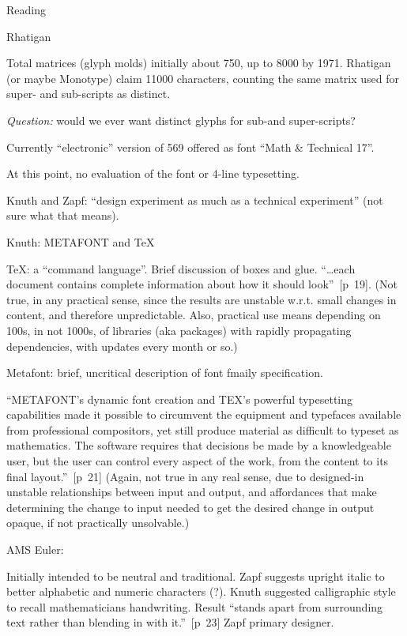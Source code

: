 \documentclass[11pt]{PalisadesLakesBook}
\begin{document}
\begin{plSection}{Reading}
\begin{plSection}{Rhatigan}
\begin{plSection}{}
\begin{plSection}{}
Total matrices (glyph molds) initially about 750, 
up to 8000 by 1971. 
Rhatigan (or maybe Monotype) claim 11000 characters,
counting the same matrix used for super- and sub-scripts
as distinct.

\emph{Question:} would we ever want distinct glyphs 
for sub-and super-scripts?

Currently ``electronic'' version of 569 offered as font
``Math \& Technical 17''.

At this point, no evaluation of the font or 4-line typesetting.

\end{plSection}%
\begin{plSection}{}

Knuth and Zapf: 
``design experiment as much as a technical experiment''
(not sure what that means).

Knuth: METAFONT and {\TeX}

TeX: a ``command language''. Brief discussion of boxes and glue.
``{\ldots}each document contains complete information 
about how it should look''~[p~19]. 
(Not true, in any practical sense,
since the results are unstable w.r.t. small changes in content,
and therefore unpredictable. Also, practical use means depending
on 100s, in not 1000s, of libraries (aka packages) 
with rapidly propagating dependencies, 
with updates every month or so.)

Metafont: brief, uncritical description of font fmaily specification.

``METAFONT's dynamic font creation and 
TEX's powerful typesetting capabilities 
made it possible to circumvent the equipment and typefaces 
available from professional compositors,
yet still produce material as difficult to typeset as mathematics. 
The software requires that decisions be made 
by a knowledgeable user, 
but the user can control every aspect of the work, 
from the content to its final layout.''~[p~21]
(Again, not true in any real sense, due to designed-in unstable
relationships between input and output, and 
affordances that make determining the change to input needed
to get the desired change in output opaque,
if not practically unsolvable.)

AMS Euler: 

Initially intended to be neutral and traditional.
Zapf suggests upright italic to better alphabetic and numeric
characters (?).
Knuth suggested calligraphic style to recall mathematicians
handwriting.
Result ``stands apart from surrounding text 
rather than blending in with it.''~[p~23]
Zapf primary designer.


\end{plSection}
\end{plSection}
\end{plSection}
\end{plSection}
\end{document}
